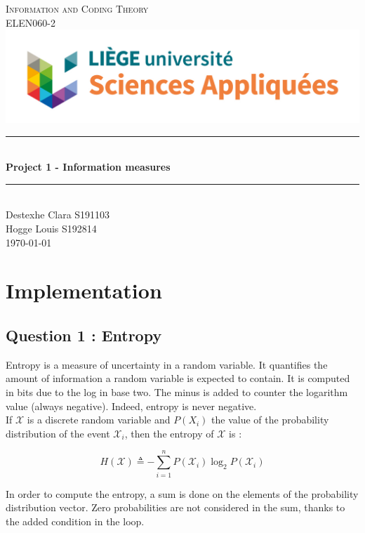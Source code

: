 \documentclass[titlepage]{article}
\begin{document}
\begin{titlepage}
\newcommand{\HRule}{\rule{\linewidth}{0.5mm}}
\center
\textsc{\LARGE
Information and Coding Theory 
} \\[1cm]
\textsc{\LARGE
ELEN060-2
} \\[1cm]
\includegraphics[scale=0.2]{logo.jpg} \\[3cm]
\HRule \\[0.4cm]
{ \huge \bfseries Project 1 - Information measures \\[0.15cm] }
\HRule \\[1.5cm]
Destexhe Clara S191103 \\
Hogge Louis S192814
\\[1.5cm]
\today \\ [1cm]
\end{titlepage}


\section{Implementation}

\subsection*{Question 1 : Entropy}

Entropy is a measure of uncertainty in a random variable. It quantifies the amount of information a random variable is expected to contain. It is computed in bits due to the log in base two. The minus is added to counter the logarithm value (always negative). Indeed, entropy is never negative. \\

If $\mathcal{X}$ is a discrete random variable and $P(X_i)$ the value of the probability distribution of the event $\mathcal{X}_i$, then the entropy of $\mathcal{X}$ is :

$$H(\mathcal{X}) \triangleq-\sum_{i=1}^n P\left(\mathcal{X}_i\right) \log_2 P\left(\mathcal{X}_i\right)$$

In order to compute the entropy, a sum is done on the elements of the probability distribution vector. Zero probabilities are not considered in the sum, thanks to the added condition in the loop. 
\end{document}
